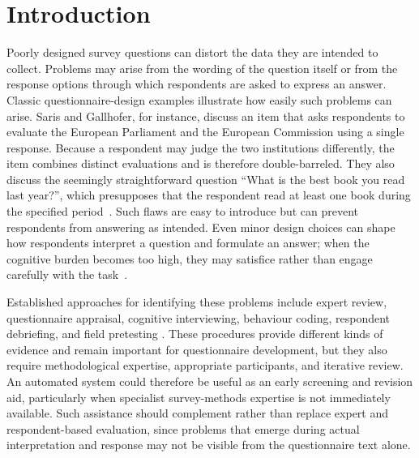 \documentclass[11pt,a4paper]{article}
\begin{document}

\newpage

\tableofcontents

\newpage



\section{Introduction}
\label{sec:introduction}

Poorly designed survey questions can distort the data they are intended to collect.
Problems may arise from the wording of the question itself or from the response
options through which respondents are asked to express an answer.  
Classic questionnaire-design examples illustrate how easily such
problems can arise. Saris and Gallhofer, for instance, discuss an item that asks
respondents to evaluate the European Parliament and the European Commission using
a single response. Because a respondent may judge the two institutions differently,
the item combines distinct evaluations and is therefore double-barreled. They also
discuss the seemingly straightforward question ``What is the best book you read last
year?'', which presupposes that the respondent read at least one book during the
specified period~\cite{saris2014design}. Such flaws are easy to introduce but can
prevent respondents from answering as intended. Even minor design choices can shape
how respondents interpret a question and formulate an answer; when the cognitive
burden becomes too high, they may satisfice rather than engage carefully with the
task~\cite{tourangeau2000psychology,krosnick1991response}.

Established approaches for identifying these problems include expert review,
questionnaire appraisal, cognitive interviewing, behaviour coding, respondent
debriefing, and field pretesting \cite{presser2004methods}. These procedures provide
different kinds of evidence and remain important for questionnaire development, but
they also require methodological expertise, appropriate participants, and iterative
review. An automated system could therefore be useful as an early screening and
revision aid, particularly when specialist survey-methods expertise is not immediately
available. Such assistance should complement rather than replace expert and
respondent-based evaluation, since problems that emerge during actual interpretation
and response may not be visible from the questionnaire text alone.
\end{document}

